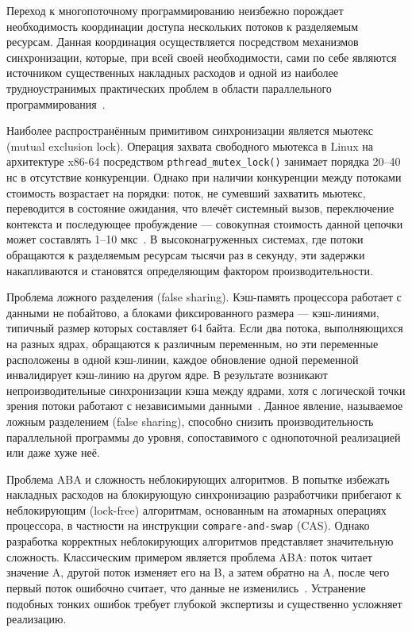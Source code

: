 Переход к многопоточному программированию неизбежно порождает необходимость координации доступа нескольких потоков к разделяемым ресурсам. Данная координация осуществляется посредством механизмов синхронизации, которые, при всей своей необходимости, сами по себе являются источником существенных накладных расходов и одной из наиболее трудноустранимых практических проблем в области параллельного программирования~\cite{Herlihy2020}.

Наиболее распространённым примитивом синхронизации является мьютекс (mutual exclusion lock). Операция захвата свободного мьютекса в Linux на архитектуре x86-64 посредством \texttt{pthread\_mutex\_lock()} занимает порядка 20--40 нс в отсутствие конкуренции. Однако при наличии конкуренции между потоками стоимость возрастает на порядки: поток, не сумевший захватить мьютекс, переводится в состояние ожидания, что влечёт системный вызов, переключение контекста и последующее пробуждение --- совокупная стоимость данной цепочки может составлять 1--10 мкс~\cite{Drepper2003}. В высоконагруженных системах, где потоки обращаются к разделяемым ресурсам тысячи раз в секунду, эти задержки накапливаются и становятся определяющим фактором производительности.

Проблема ложного разделения (false sharing). Кэш-память процессора работает с данными не побайтово, а блоками фиксированного размера --- кэш-линиями, типичный размер которых составляет 64 байта. Если два потока, выполняющихся на разных ядрах, обращаются к различным переменным, но эти переменные расположены в одной кэш-линии, каждое обновление одной переменной инвалидирует кэш-линию на другом ядре. В результате возникают непроизводительные синхронизации кэша между ядрами, хотя с логической точки зрения потоки работают с независимыми данными~\cite{Drepper2007}. Данное явление, называемое ложным разделением (false sharing), способно снизить производительность параллельной программы до уровня, сопоставимого с однопоточной реализацией или даже хуже неё.

Проблема ABA и сложность неблокирующих алгоритмов. В попытке избежать накладных расходов на блокирующую синхронизацию разработчики прибегают к неблокирующим (lock-free) алгоритмам, основанным на атомарных операциях процессора, в частности на инструкции \texttt{compare-and-swap} (CAS). Однако разработка корректных неблокирующих алгоритмов представляет значительную сложность. Классическим примером является проблема ABA: поток читает значение A, другой поток изменяет его на B, а затем обратно на A, после чего первый поток ошибочно считает, что данные не изменились~\cite{Michael1996}. Устранение подобных тонких ошибок требует глубокой экспертизы и существенно усложняет реализацию.

